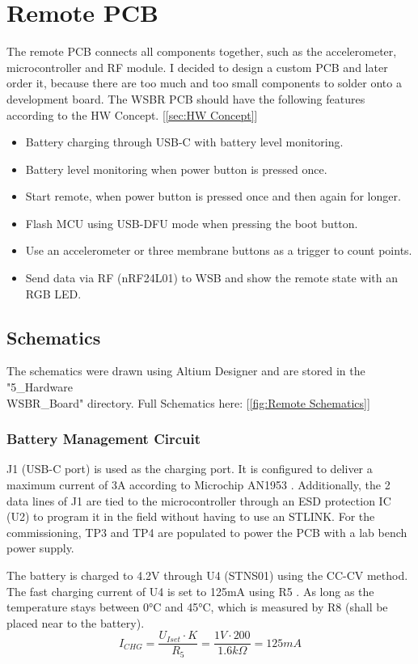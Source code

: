 \section{Remote PCB}
\label{sec:Remote PCB}
The remote PCB connects all components together, such as the accelerometer, microcontroller and RF module. I decided to design a custom PCB and later order it, because there are too much and too small components to solder onto a development board. The WSBR PCB should have the following features according to the HW Concept. [\ref{sec:HW Concept}]

\begin{itemize}
    \item Battery charging through USB-C with battery level monitoring.
    \item Battery level monitoring when power button is pressed once.
    \item Start remote, when power button is pressed once and then again for longer.
    \item Flash MCU using USB-DFU mode when pressing the boot button.
    \item Use an accelerometer or three membrane buttons as a trigger to count points.
    \item Send data via RF (nRF24L01) to WSB and show the remote state with an RGB LED.
\end{itemize}


\subsection{Schematics}
The schematics were drawn using Altium Designer and are stored in the "5\_Hardware\\WSBR\_Board" directory. Full Schematics here: [\ref{fig:Remote Schematics}]

\label{ssec:Schematics}

\subsubsection{Battery Management Circuit}
J1 (USB-C port) is used as the charging port. It is configured to deliver a maximum current of 3A according to Microchip AN1953 \cite{AN1953}. Additionally, the 2 data lines of J1 are tied to the microcontroller through an ESD protection IC (U2) to program it in the field without having to use an STLINK. For the commissioning, TP3 and TP4 are populated to power the PCB with a lab bench power supply.

The battery is charged to 4.2V through U4 (STNS01) using the CC-CV method. The fast charging current of U4 is set to 125mA using R5 \cite{DS_STNS01}. As long as the temperature stays between 0°C and 45°C, which is measured by R8 (shall be placed near to the battery).
$$I_{CHG}=\frac{U_{Iset} \cdot K}{R_5}=\frac{1V \cdot 200}{1.6k\Omega}=125mA$$

